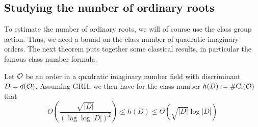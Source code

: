 \subsection{Studying the number of ordinary roots}
To estimate the number of ordinary roots, we will of course use the class group action.
Thus, we need a bound on the class number of quadratic imaginary orders.
The next theorem puts together some classical results, in particular the famous class number formula.
\begin{theorem}
    \label{prop:class_number_bounds}
    Let $\mathcal{O}$ be an order in a quadratic imaginary number field with discriminant $D = d(\mathcal{O})$.
    Assuming GRH, we then have for the class number $h(D) := \#\mathrm{Cl}(\mathcal{O})$ that
    \begin{equation*}
        \Theta\left(\frac {\sqrt{|D|}} {(\log\log|D|)^2}\right) \leq h(D) \leq \Theta\left(\sqrt{|D|} \log|D|\right)
    \end{equation*}
\end{theorem}

